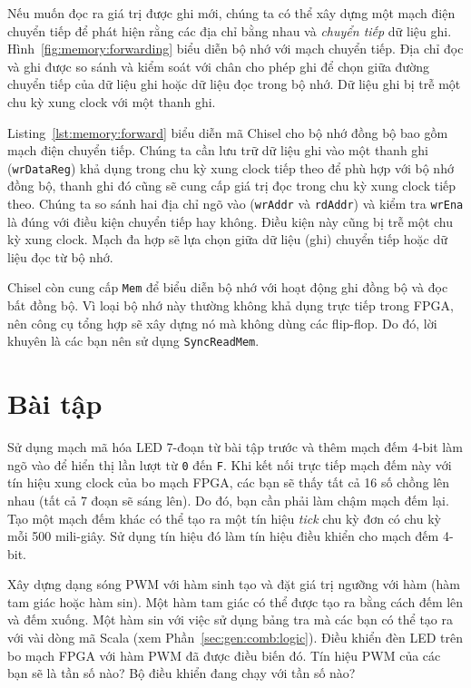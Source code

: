 \documentclass[%
    10pt,
    headinclude, footexclude,
    openright, %
    notitlepage,
    cleardoubleempty,
    headsepline,
    pointlessnumbers,
    bibtotoc, idxtotoc,
    ]{scrbook}
\newcommand{\code}[1]{{\small{\texttt{#1}}}}
\begin{document}
Nếu muốn đọc ra giá trị được ghi mới, chúng ta có thể xây dựng một mạch điện 
chuyển tiếp để phát hiện rằng các địa chỉ bằng nhau và \emph{chuyển tiếp} dữ liệu ghi. 
Hình~\ref{fig:memory:forwarding} biểu diễn bộ nhớ với mạch chuyển tiếp. 
Địa chỉ đọc và ghi được so sánh và kiểm soát với chân cho phép ghi để chọn giữa 
đường chuyển tiếp của dữ liệu ghi hoặc dữ liệu đọc trong bộ nhớ. 
Dữ liệu ghi bị trễ một chu kỳ xung clock với một thanh ghi. 

Listing~\ref{lst:memory:forward} biểu diễn mã Chisel cho bộ nhớ đồng bộ
bao gồm mạch điện chuyển tiếp. Chúng ta cần lưu trữ dữ liệu ghi vào một thanh ghi
(\code{wrDataReg}) khả dụng trong chu kỳ xung clock tiếp theo để phù hợp với
bộ nhớ đồng bộ, thanh ghi đó cũng sẽ cung cấp giá trị đọc trong chu kỳ xung clock tiếp theo.
Chúng ta so sánh hai địa chỉ ngõ vào (\code{wrAddr} và \code{rdAddr})
và kiểm tra \code{wrEna} là đúng với điều kiện chuyển tiếp hay không.
Điều kiện này cũng bị trễ một chu kỳ xung clock.
Mạch đa hợp sẽ lựa chọn giữa dữ liệu (ghi) chuyển tiếp hoặc dữ liệu đọc từ bộ nhớ. 


Chisel còn cung cấp \code{Mem} để biểu diễn bộ nhớ với hoạt động ghi đồng bộ và đọc bất đồng bộ. 
Vì loại bộ nhớ này thường không khả dụng trực tiếp trong FPGA, nên công cụ tổng hợp sẽ xây dựng nó 
mà không dùng các flip-flop. Do đó, lời khuyên là các bạn nên sử dụng \code{SyncReadMem}. 

\section{Bài tập}

Sử dụng mạch mã hóa LED 7-đoạn từ bài tập trước và thêm mạch đếm 4-bit làm ngõ vào 
để hiển thị lần lượt từ \code{0} đến \code{F}. Khi kết nối trực tiếp mạch đếm 
này với tín hiệu xung clock của bo mạch FPGA, các bạn sẽ thấy tất cả 16 số chồng 
lên nhau (tất cả 7 đoạn sẽ sáng lên). Do đó, bạn cần phải làm chậm mạch đếm lại. 
Tạo một mạch đếm khác có thể tạo ra một tín hiệu \emph{tick} chu kỳ đơn có chu kỳ mỗi 500 mili-giây.
Sử dụng tín hiệu đó làm tín hiệu điều khiển cho mạch đếm 4-bit. 

Xây dựng dạng sóng PWM với hàm sinh tạo và đặt giá trị ngưỡng với hàm (hàm tam giác hoặc hàm sin).
Một hàm tam giác có thể được tạo ra bằng cách đếm lên và đếm xuống. Một hàm sin với 
việc sử dụng bảng tra mà các bạn có thể tạo ra với vài dòng mã Scala (xem Phần~\ref{sec:gen:comb:logic}).
Điều khiển đèn LED trên bo mạch FPGA với hàm PWM đã được điều biến đó. 
Tín hiệu PWM của các bạn sẽ là tần số nào? Bộ điều khiển đang chạy với tần số nào? 
\end{document}
